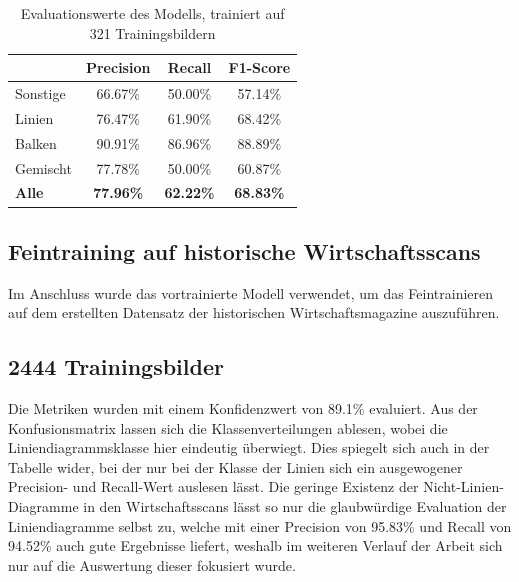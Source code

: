 \begin{table}[H]
    \centering
    \begin{tabular}{|l|c|c|c|}
        \hline
        \rowcolor[HTML]{EFEFEF}
                      & Precision        & Recall           & F1-Score         \\ \hline
        Sonstige      & 66.67\%          & 50.00\%          & 57.14\%          \\ \hline
        Linien        & 76.47\%          & 61.90\%          & 68.42\%          \\ \hline
        Balken        & 90.91\%          & 86.96\%          & 88.89\%          \\ \hline
        Gemischt      & 77.78\%          & 50.00\%          & 60.87\%          \\ \hline
        \textbf{Alle} & \textbf{77.96\%} & \textbf{62.22\%} & \textbf{68.83\%} \\ \hline
    \end{tabular}
    \caption{Evaluationswerte des Modells, trainiert auf 321 Trainingsbildern}
\end{table}


\subsection{Feintraining auf historische Wirtschaftsscans}

Im Anschluss wurde das vortrainierte Modell verwendet, um das Feintrainieren auf dem erstellten Datensatz der historischen Wirtschaftsmagazine auszuführen.

\subsection*{2444 Trainingsbilder}
Die Metriken wurden mit einem Konfidenzwert von 89.1\% evaluiert. Aus der Konfusionsmatrix lassen sich die Klassenverteilungen ablesen, wobei die Liniendiagrammsklasse hier eindeutig überwiegt. Dies spiegelt sich auch in der Tabelle wider, bei der nur bei der Klasse der Linien sich ein ausgewogener Precision- und Recall-Wert auslesen lässt. Die geringe Existenz der Nicht-Linien-Diagramme in den Wirtschaftsscans lässt so nur die glaubwürdige Evaluation der Liniendiagramme selbst zu, welche mit einer Precision von 95.83\% und Recall von 94.52\% auch gute Ergebnisse liefert, weshalb im weiteren Verlauf der Arbeit sich nur auf die Auswertung dieser fokusiert wurde.


